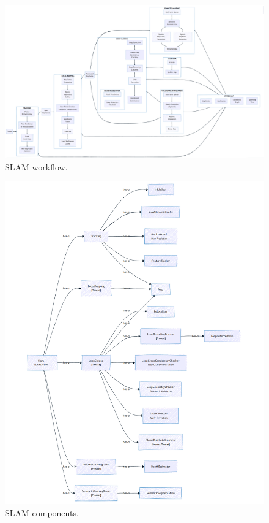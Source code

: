 \documentclass{article}
\begin{document}
\newpage

\begin{figure}[!t]
\begin{center}
    \includegraphics[width=\textwidth]{./images/slam_workflow.png}
\end{center}
\caption{SLAM workflow.}
\label{Fig:SLAMWorfklow}
\end{figure}

\begin{figure}[!t]
\begin{center}
    \includegraphics[width=\textwidth]{./images/slam_components.png}
\end{center}
\caption{SLAM components.}
\label{Fig:SLAMComponents}
\end{figure}
\end{document}
